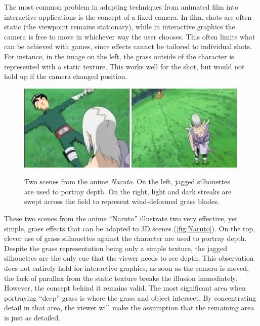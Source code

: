 \documentclass[notitlepage]{report}
\begin{document}
The most common problem in adapting techniques from animated film into interactive applications is the concept of a fixed camera. In film, shots are often static (the viewpoint remains stationary), while in interactive graphics the camera is free to move in whichever way the user chooses. This often limits what can be achieved with games, since effects cannot be tailored to individual shots. For instance, in the image on the left, the grass outside of the character is represented with a static texture. This works well for the shot, but would not hold up if the camera changed position.


\begin{figure}[h]
\centering
\includegraphics[width=0.49\textwidth]{img/NarutoEdge} \hfill
\includegraphics[width=0.49\textwidth]{img/NarutoStreak}
\caption{Two scenes from the anime \emph{Naruto}. On the left, jagged silhouettes are used to portray depth. On the right, light and dark streaks are swept across the field to represent wind-deformed grass blades.}
\label{fig:Naruto}
\end{figure}

These two scenes from the anime “Naruto” illustrate two very effective, yet simple, grass effects that can be adapted to 3D scenes (\autoref{fig:Naruto}). On the top, clever use of grass silhouettes against the character are used to portray depth. Despite the grass representation being only a simple texture, the jagged silhouettes are the only cue that the viewer needs to see depth. This observation does not entirely hold for interactive graphics; as soon as the camera is moved, the lack of parallax from the static texture breaks the illusion immediately. However, the concept behind it remains valid. The most significant area when portraying ``deep'' grass is where the grass and object intersect. By concentrating detail in that area, the viewer will make the assumption that the remaining area is just as detailed.
\end{document}
